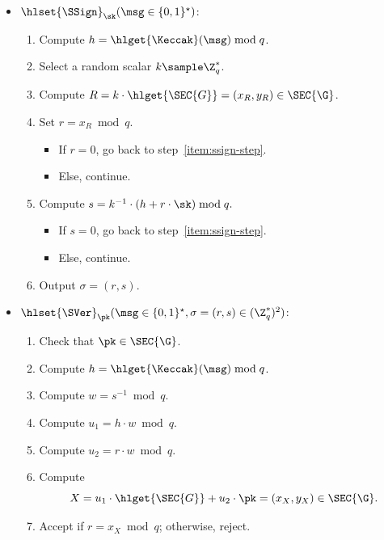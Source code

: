 \begin{mdframed}
	\begin{minipage}[t]{0.46\textwidth}
		\begin{itemize}
			\item[$\bullet$] $\hlset{\SSign}_{\sk}(\msg \in \{0,1\}^\star)$:  \vspace{0.1cm}
			\begin{enumerate}
				\item Compute $h = \hlget{\Keccak}(\msg) \bmod q$.
				\item\label{item:ssign-step} Select a random scalar $k \sample \Z_q^{*}$.
				\item Compute $R = k \cdot \hlget{\SEC{G}} = (x_R, y_R) \in \SEC{\G}$.
				\item Set $r = x_R \bmod q$. 
				\begin{itemize}
					\item If $r = 0$, go back to step~\ref{item:ssign-step}. 
					\item Else, continue.
				\end{itemize}
				\item Compute $s = k^{-1} \cdot (h + r \cdot \sk) \bmod q.$ 
				\begin{itemize}
					\item If $s = 0$, go back to step~\ref{item:ssign-step}. 
					\item Else, continue.
				\end{itemize}
				\item Output $\sigma = (r, s)$.
			\end{enumerate}
		\end{itemize}
	\end{minipage}
	\begin{minipage}[t]{0.54\textwidth}
		\begin{itemize}
			\item[$\bullet$] $\hlset{\SVer}_{\pk}(\msg \in \{0,1\}^\star, \sigma = (r, s)\in(\Z_q^*)^2)$: %
			\begin{enumerate}
				\item Check that $\pk \in \SEC{\G}$.
				\item Compute $h = \hlget{\Keccak}(\msg) \bmod q$.
				\item Compute $w = s^{-1} \bmod q$.
				\item Compute $u_1 = h \cdot w \bmod q$.
				\item Compute $u_2 = r \cdot w \bmod q$.
				\item Compute $$X = u_1 \cdot \hlget{\SEC{G}} + u_2 \cdot \pk = (x_X, y_X) \in \SEC{\G}.$$
				\item Accept if $r = x_X \bmod q$; otherwise, reject.
			\end{enumerate}
		\end{itemize}
	\end{minipage}
\end{mdframed}

